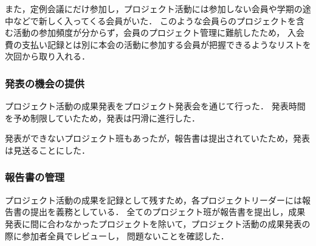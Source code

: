 また，定例会議にだけ参加し，プロジェクト活動には参加しない会員や学期の途中などで新しく入ってくる会員がいた．
このような会員らのプロジェクトを含む活動の参加頻度が分からず，会員のプロジェクト管理に難航したため，
入会費の支払い記録とは別に本会の活動に参加する会員が把握できるようなリストを次回から取り入れる．

\subsubsection*{発表の機会の提供}

プロジェクト活動の成果発表をプロジェクト発表会を通じて行った．
発表時間を予め制限していたため，発表は円滑に進行した．

発表ができないプロジェクト班もあったが，報告書は提出されていたため，発表は見送ることにした．

\subsubsection*{報告書の管理}

プロジェクト活動の成果を記録として残すため，各プロジェクトリーダーには報告書の提出を義務としている．
全てのプロジェクト班が報告書を提出し，成果発表に間に合わなかったプロジェクトを除いて，プロジェクト活動の成果発表の際に参加者全員でレビューし，
問題ないことを確認した．
